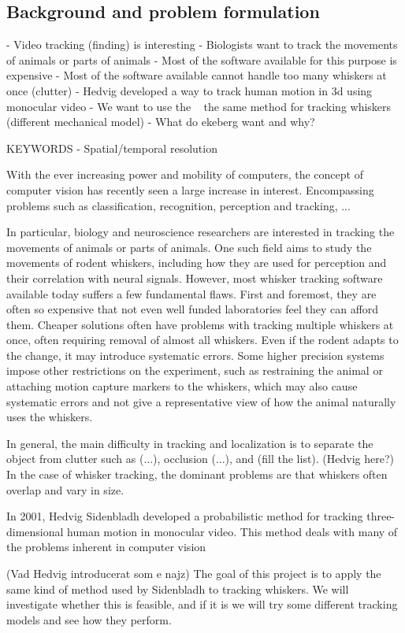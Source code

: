 \subsection{Background and problem formulation}

- Video tracking (finding) is interesting
- Biologists want to track the movements of animals or parts of animals
- Most of the software available for this purpose is expensive
- Most of the software available cannot handle too many whiskers at once (clutter)
- Hedvig developed a way to track human motion in 3d using monocular video
- We want to use the ~ the same method for tracking whiskers (different mechanical model)
- What do ekeberg want and why?

KEYWORDS
- Spatial/temporal resolution

With the ever increasing power and mobility of computers, the concept of computer vision has recently seen a large increase in interest. Encompassing problems such as classification, recognition, perception and tracking, ...

In particular, biology and neuroscience researchers are interested in tracking the movements of animals or parts of animals. One such field aims to study the movements of rodent whiskers, including how they are used for perception and their correlation with neural signals. However, most whisker tracking software available today suffers a few fundamental flaws. First and foremost, they are often so expensive that not even well funded laboratories feel they can afford them. Cheaper solutions often have problems with tracking multiple whiskers at once, often requiring removal of almost all whiskers. Even if the rodent adapts to the change, it may introduce systematic errors. Some higher precision systems impose other restrictions on the experiment, such as restraining the animal or attaching motion capture markers to the whiskers, which may also cause systematic errors and not give a representative view of how the animal naturally uses the whiskers.

In general, the main difficulty in tracking and localization is to separate the object from clutter such as (...), occlusion (...), and (fill the list). (Hedvig here?) In the case of whisker tracking, the dominant problems are that whiskers often overlap and vary in size.

In 2001, Hedvig Sidenbladh developed a probabilistic method for tracking three-dimensional human motion in monocular video. This method deals with many of the problems inherent in computer vision

(Vad Hedvig introducerat som e najz) The goal of this project is to apply the same kind of method used by Sidenbladh to tracking whiskers. We will investigate whether this is feasible, and if it is we will try some different tracking models and see how they perform.

